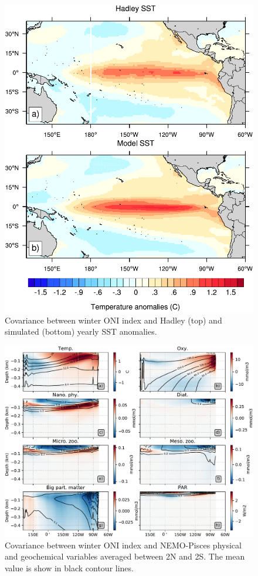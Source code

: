 \begin{figure}[h!]
	\centering
	\includegraphics[scale=0.75] {figs/covariance_maps_hadley_model.pdf}
	\caption{Covariance between winter ONI index and Hadley (top) and simulated (bottom) yearly SST anomalies.}
	\label{fig:cov-sst}
\end{figure}

\begin{figure}[h!]
	\centering
	\includegraphics[scale=0.5] {figs/covariance_profiles.pdf}
	\caption{Covariance between winter ONI index and NEMO-Pisces physical and geochemical variables averaged between 2N and 2S. The mean value is show in black contour lines.}
	\label{fig:cov-prof}
\end{figure}

